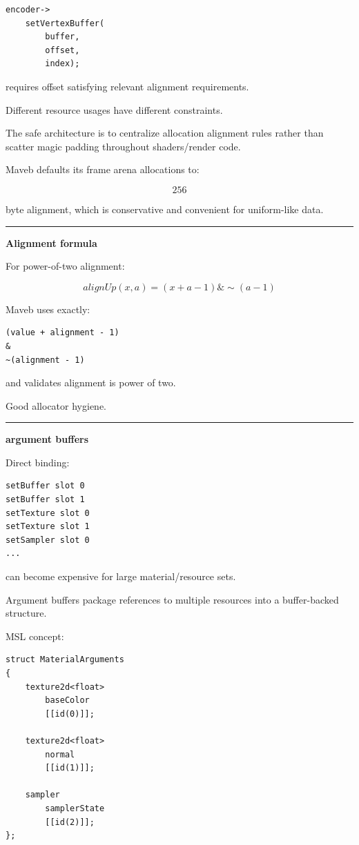 \begin{verbatim}
encoder->
    setVertexBuffer(
        buffer,
        offset,
        index);
\end{verbatim}

requires offset satisfying relevant alignment requirements.

Different resource usages have different constraints.

The safe architecture is to centralize allocation alignment rules rather than scatter magic padding throughout shaders/render code.

Maveb defaults its frame arena allocations to:

\[
256
\]

byte alignment, which is conservative and convenient for uniform-like data.

\begin{center}\rule{0.5\linewidth}{0.5pt}\end{center}

\textbf{Alignment formula}

For power-of-two alignment:

\[
\boxed{
alignUp(x,a)
=
(x+a-1)\&
\sim(a-1)
}
\]

Maveb uses exactly:

\begin{verbatim}
(value + alignment - 1)
&
~(alignment - 1)
\end{verbatim}

and validates alignment is power of two.

Good allocator hygiene.

\begin{center}\rule{0.5\linewidth}{0.5pt}\end{center}

\textbf{argument buffers}

Direct binding:

\begin{verbatim}
setBuffer slot 0
setBuffer slot 1
setTexture slot 0
setTexture slot 1
setSampler slot 0
...
\end{verbatim}

can become expensive for large material/resource sets.

Argument buffers package references to multiple resources into a buffer-backed structure.

MSL concept:

\begin{verbatim}
struct MaterialArguments
{
    texture2d<float>
        baseColor
        [[id(0)]];

    texture2d<float>
        normal
        [[id(1)]];

    sampler
        samplerState
        [[id(2)]];
};
\end{verbatim}

